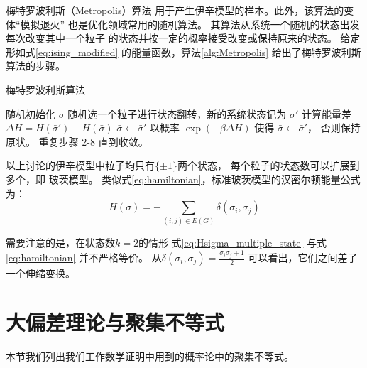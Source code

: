 梅特罗波利斯（Metropolis）算法\cite{metropolis1953equation}
用于产生伊辛模型的样本。此外，该算法的变体“模拟退火”
\cite{pincus1970monte} 也是优化领域常用的随机算法。
其算法从系统一个随机的状态出发每次改变其中一个粒子
的状态并按一定的概率接受改变或保持原来的状态。
给定形如式\eqref{eq:ising_modified}
的能量函数，算法\ref{alg:Metropolis}
给出了梅特罗波利斯算法的步骤。

\begin{algorithm}
  \caption{梅特罗波利斯算法}\label{alg:Metropolis}
  \begin{algorithmic}[1]
    \STATE 随机初始化 $\bar{\sigma}$
    \STATE 随机选一个粒子进行状态翻转，新的系统状态记为 $\bar{\sigma}'$ 
    \STATE 计算能量差 $\Delta H= H(\bar{\sigma}') - H(\bar{\sigma})$
    \STATE $\bar{\sigma} \leftarrow \bar{\sigma}'$
    \ELSE
    \STATE 以概率 $\exp(-\beta \Delta H)$ 
    使得 $\bar{\sigma} \leftarrow \bar{\sigma}'$，
    否则保持原状。 
    \ENDIF
    \STATE 重复步骤 2-8 直到收敛。
\end{algorithmic}  
\end{algorithm}

以上讨论的伊辛模型中粒子均只有$\{\pm 1\}$两个状态，
每个粒子的状态数可以扩展到多个，即 玻茨模型\cite{potts1952some}。
类似式\eqref{eq:hamiltonian}，标准玻茨模型的汉密尔顿能量公式为：
\begin{equation}\label{eq:Hsigma_multiple_state}
  H(\sigma) = -\sum_{(i,j) \in E(G)}\delta(\sigma_i, \sigma_j)
\end{equation}
\begin{remark}\label{rem:equivalence_H_energy}
需要注意的是，在状态数$k=2$的情形
式\eqref{eq:Hsigma_multiple_state} 
与式\eqref{eq:hamiltonian}
并不严格等价。
从$\delta(\sigma_i, \sigma_j) = \frac{\sigma_i \sigma_j + 1}{2}$
可以看出，它们之间差了一个伸缩变换。
\end{remark}
\section{大偏差理论与聚集不等式}
本节我们列出我们工作数学证明中用到的概率论中的聚集不等式。

